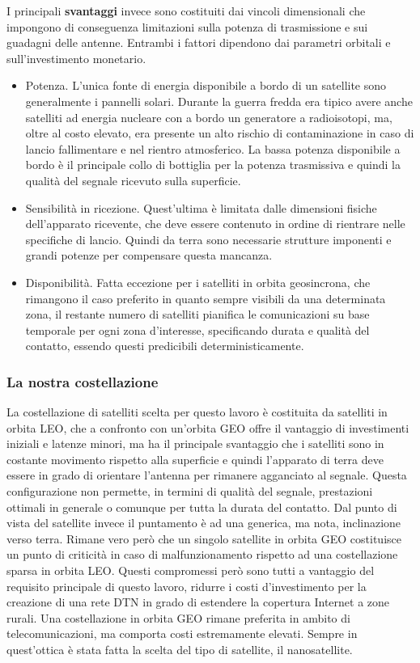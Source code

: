 \documentclass[a4paper]{article}
\begin{document}
			I principali {\bf svantaggi} invece sono costituiti dai vincoli dimensionali che impongono di conseguenza limitazioni sulla potenza di trasmissione e sui guadagni delle antenne.	Entrambi i fattori dipendono dai parametri orbitali e sull'investimento monetario. 
			\begin{itemize}
				\item Potenza. L'unica fonte di energia disponibile a bordo di un satellite sono generalmente i pannelli solari. Durante la guerra fredda era tipico avere anche satelliti ad energia nucleare con a bordo un generatore a radioisotopi, ma, oltre al costo elevato, era presente un alto rischio di contaminazione in caso di lancio fallimentare e nel rientro atmosferico.
				La bassa potenza disponibile a bordo è il principale collo di bottiglia per la potenza trasmissiva e quindi la qualità del segnale ricevuto sulla superficie. 
				\item Sensibilità in ricezione. Quest'ultima è limitata dalle dimensioni fisiche dell'apparato ricevente, che deve essere contenuto in ordine di rientrare nelle specifiche di lancio. Quindi da terra sono necessarie strutture imponenti e grandi potenze per compensare questa mancanza. 
				\item Disponibilità. Fatta eccezione per i satelliti in orbita geosincrona, che rimangono il caso preferito in quanto sempre visibili da una determinata zona, il restante numero di satelliti pianifica le comunicazioni su base temporale per ogni zona d'interesse, specificando durata e qualità del contatto, essendo questi predicibili deterministicamente.
				 
			\end{itemize}
			\subsubsection{La nostra costellazione}
			La costellazione di satelliti scelta per questo lavoro è costituita da satelliti in orbita LEO, che a confronto con un'orbita GEO offre il vantaggio di investimenti iniziali e latenze minori, ma ha il principale svantaggio che i satelliti sono in costante movimento rispetto alla superficie e quindi l'apparato di terra deve essere in grado di orientare l'antenna per rimanere agganciato al segnale. Questa configurazione non permette, in termini di qualità del segnale, prestazioni ottimali in generale o comunque per tutta la durata del contatto. Dal punto di vista del satellite invece il puntamento è ad una generica, ma nota, inclinazione verso terra. Rimane vero però che un singolo satellite in orbita GEO costituisce un punto di criticità in caso di malfunzionamento rispetto ad una costellazione sparsa in orbita LEO. Questi compromessi però sono tutti a vantaggio del requisito principale di questo lavoro, ridurre i costi d'investimento per la creazione di una rete DTN in grado di estendere la copertura Internet a zone rurali. Una costellazione in orbita GEO rimane preferita in ambito di telecomunicazioni, ma comporta costi estremamente elevati. Sempre in quest'ottica è stata fatta la scelta del tipo di satellite, il nanosatellite.
			
\end{document}
